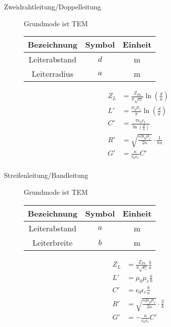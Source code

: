 \begin{description}
\item[Zweidrahtleitung/Doppelleitung] Grundmode ist TEM
\begin{center}
\begin{tabular}{ccc} \toprule
Bezeichnung & Symbol & Einheit \\ \midrule
Leiterabstand & $d$ &  \si{\meter}\\
Leiterradius & $a$ &  \si{\meter}\\
\bottomrule
\end{tabular}
\end{center}
\begin{center}
\begin{tikzpicture}[scale=0.2, every node/.style={scale=0.8}]

\end{tikzpicture}
\end{center}
\begin{align*}
Z_L &= \frac{Z_{F0}}{\pi\sqrt{\epsilon_r}} \ln\left( \frac{d}{a} \right) \\
L' &= \frac{\mu_0 \mu_r}{\pi} \ln\left(\frac{d}{a}\right) \\
C' &= \frac{\pi \epsilon_0 \epsilon_r}{\ln\left(\frac{d}{a}\right)} \\
R' &= \sqrt{\frac{\omega \mu_0 \mu_r}{2 \kappa}} \cdot \frac{1}{\pi a} \\
G' &= \frac{\kappa}{\epsilon_0 \epsilon_r} C' \\
\end{align*}

\item[Streifenleitung/Bandleitung] Grundmode ist TEM
\begin{center}
\begin{tabular}{ccc} \toprule
Bezeichnung & Symbol & Einheit \\ \midrule
Leiterabstand & $a$ &  \si{\meter}\\
Leiterbreite & $b$ &  \si{\meter}\\
\bottomrule
\end{tabular}
\end{center}
\begin{center}
\begin{tikzpicture}[scale=0.2, every node/.style={scale=0.8}]

\end{tikzpicture}
\end{center}
\begin{align*}
Z_L &= \frac{Z_{F0}}{\pi\sqrt{\epsilon_r}} \frac{b}{a}\\
L' &= \mu_0 \mu_r \frac{a}{b}\\
C' &= \epsilon_0 \epsilon_r \frac{b}{a}\\
R' &= \sqrt{\frac{\omega \mu_0 \mu_r}{2 \kappa}} \cdot \frac{2}{b}\\
G' &= - \frac{\kappa}{\epsilon_0 \epsilon_r} C' \\
\end{align*}


\end{description}
